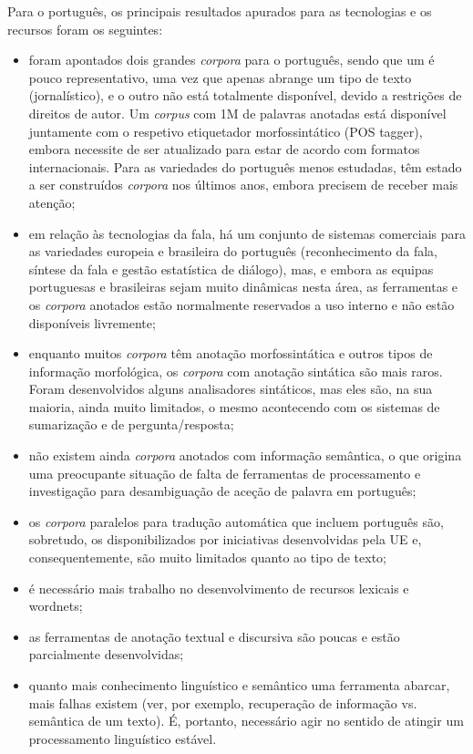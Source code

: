 \documentclass[]{../metanetpaper}
\begin{document}
\begin{multicols}{2}
Para o português, os principais resultados apurados para as tecnologias e os recursos foram os seguintes:

\begin{itemize}
 \item foram apontados dois grandes \textit{corpora} para o português, sendo que um é pouco representativo, uma vez que apenas abrange um tipo de texto (jornalístico), e o outro não está totalmente disponível, devido a restrições de direitos de autor. Um \textit{corpus} com 1M de palavras anotadas está disponível juntamente com o respetivo etiquetador morfossintático (POS tagger), embora necessite de ser atualizado para estar de acordo com formatos internacionais. Para as variedades do português menos estudadas, têm estado a ser construídos \textit{corpora} nos últimos anos, embora precisem de receber mais atenção;
   \item em relação às tecnologias da fala, há um conjunto de sistemas comerciais para as variedades europeia e brasileira do português (reconhecimento da fala, síntese da fala e gestão estatística de diálogo), mas, e embora as equipas portuguesas e brasileiras sejam muito dinâmicas nesta área, as ferramentas e os \textit{corpora} anotados estão normalmente reservados a uso interno e não estão disponíveis livremente;
   \item enquanto muitos \textit{corpora} têm anotação morfossintática e outros tipos de informação morfológica, os \textit{corpora} com anotação sintática são mais raros. Foram desenvolvidos alguns analisadores sintáticos, mas eles são, na sua maioria, ainda muito limitados, o mesmo acontecendo com os sistemas de sumarização e de pergunta/resposta;
   \item não existem ainda \textit{corpora} anotados com informação semântica, o que origina uma preocupante situação de falta de ferramentas de processamento e investigação para desambiguação de aceção de palavra em português; 
   \item os \textit{corpora} paralelos para tradução automática que incluem português são, sobretudo, os disponibilizados por iniciativas desenvolvidas pela UE e, consequentemente, são muito limitados quanto ao tipo de texto;
   \item é necessário mais trabalho no desenvolvimento de recursos lexicais e wordnets;
   \item as ferramentas de anotação textual e discursiva são poucas e estão parcialmente desenvolvidas;
   \item quanto mais conhecimento linguístico e semântico uma ferramenta abarcar, mais falhas existem (ver, por exemplo, recuperação de informação vs. semântica de um texto). É, portanto, necessário agir no sentido de atingir um processamento linguístico estável.
\end{itemize}


\end{multicols}
\end{document}
